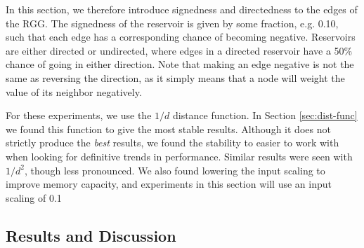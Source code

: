 In this section, we therefore introduce signedness and directedness to the edges
of the RGG. The signedness of the reservoir is given by some fraction,
e.g. 0.10, such that each edge has a corresponding chance of becoming
negative. Reservoirs are either directed or undirected, where edges in a
directed reservoir have a 50\% chance of going in either direction. Note that
making an edge negative is not the same as reversing the direction, as it simply
means that a node will weight the value of its neighbor negatively.

For these experiments, we use the $1/d$ distance function. In Section
\ref{sec:dist-func} we found this function to give the most stable
results. Although it does not strictly produce the \textit{best} results, we
found the stability to easier to work with when looking for definitive trends in
performance. Similar results were seen with $1/d^2$, though less pronounced. We
also found lowering the input scaling to improve memory capacity, and
experiments in this section will use an input scaling of 0.1

\subsection{Results and Discussion}

